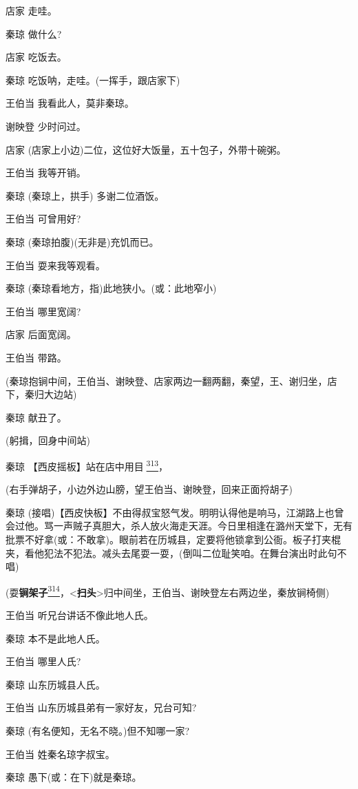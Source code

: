 店家 走哇。

秦琼 做什么?

店家 吃饭去。

秦琼 吃饭呐，走哇。(一挥手，跟店家下)

王伯当 我看此人，莫非秦琼。

谢映登 少时问过。

店家 (店家上小边)二位，这位好大饭量，五十包子，外带十碗粥。

王伯当 我等开销。

秦琼 (秦琼上，拱手) 多谢二位酒饭。

王伯当 可曾用好?

秦琼 (秦琼拍腹)(无非是)充饥而已。

王伯当 耍来我等观看。

秦琼 (秦琼看地方，指)此地狭小。(或：此地窄小)

王伯当 哪里宽阔?

店家 后面宽阔。

王伯当 带路。

(秦琼抱锏中间，王伯当、谢映登、店家两边一翻两翻，秦望，王、谢归坐，店下，秦归大边站)

秦琼 献丑了。

(躬揖，回身中间站)

秦琼
【西皮摇板】站在店中用目𥋌\protect\hyperlink{fn313}{\textsuperscript{313}}，

(右手弹胡子，小边外边山膀，望王伯当、谢映登，回来正面捋胡子)

秦琼
(接唱)【西皮快板】不由得叔宝怒气发。明明认得他是响马，江湖路上也曾会过他。骂一声贼子真胆大，杀人放火海走天涯。今日里相逢在潞州天堂下，无有批票不好拿(或：不敢拿)。眼前若在历城县，定要将他锁拿到公衙。板子打夹棍夹，看他犯法不犯法。减头去尾耍一耍，(倒叫二位耻笑咱。在舞台演出时此句不唱)

(耍\textbf{锏架子}\protect\hyperlink{fn314}{\textsuperscript{314}}，\textless{}\textbf{扫头}\textgreater{}归中间坐，王伯当、谢映登左右两边坐，秦放锏椅侧)

王伯当 听兄台讲话不像此地人氏。

秦琼 本不是此地人氏。

王伯当 哪里人氏?

秦琼 山东历城县人氏。

王伯当 山东历城县弟有一家好友，兄台可知?

秦琼 (有名便知，无名不晓。)但不知哪一家?

王伯当 姓秦名琼字叔宝。

秦琼 愚下(或：在下)就是秦琼。

